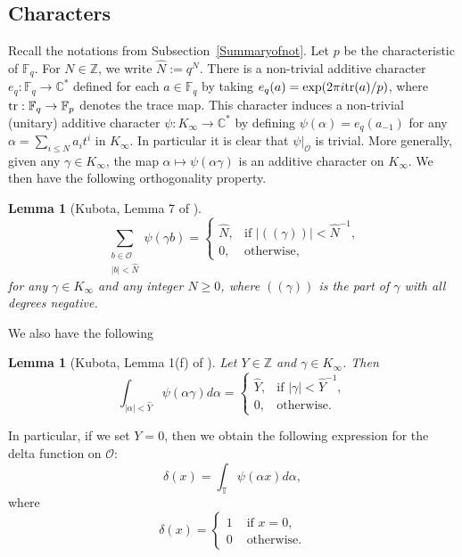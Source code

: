 \documentclass[10pt]{amsart}
\theoremstyle{plain}
\theoremstyle{plain}
\newtheorem{lemma}[theorem]{Lemma}
\theoremstyle{remark}
\theoremstyle{definition}
\newcommand{\tr}{\textup{tr}}
\renewcommand{\hat}{\widehat}
\newcommand{\Ki}{K_\infty}
\newcommand{\ki}{K_\infty}
\newcommand{\FF}{\mathbb{F}}
\newcommand{\ZZ}{\mathbb{Z}}
\newcommand{\CC}{\mathbb{C}}
\newcommand{\TT}{\mathbb{T}}
\newcommand{\cO}{\mathcal{O}}
\begin{document}
\subsection{Characters}\label{s:add-characters}
Recall the notations from Subsection~\ref{Summaryofnot}. Let $p$ be the characteristic of $\mathbb{F}_q$. For $N\in\mathbb{Z}$, we write $\hat{N}:=q^N$. There is a non-trivial additive character $e_q:\FF_q\rightarrow \CC^*$ defined
for each $a\in \FF_q$ by taking 
$e_q(a)=\exp(2\pi i \tr(a)/p)$, where $\tr: \FF_q\rightarrow \FF_p$ denotes the
trace map.
This character induces a non-trivial (unitary) additive character $\psi:
K_\infty\rightarrow \CC^*$ by defining $\psi(\alpha)=e_q(a_{-1})$ for any 
$\alpha=\sum_{i\leq N}a_i t^i$ in $\Ki$. In particular it is clear that
$\psi|_\cO$ is trivial. 
More generally, given any $\gamma \in \Ki$, the map $\alpha\mapsto \psi(\alpha\gamma)$ is an additive
character on $\Ki$. We then have the following orthogonality property.
\begin{lemma}[Kubota, Lemma 7 of
\cite{kubota}]\label{lem:orthogsum}
$$
\sum_{\substack{b\in \cO\\ |b|<\hat N}}\psi(\gamma b)=\begin{cases}
\hat N, & \mbox{if $|(\!(\gamma)\!)|<\hat N^{-1}$,}\\
0, & \mbox{otherwise},
\end{cases}
$$
for any $\gamma \in \ki$ and any integer $N\geq 0$, where $(\!(\gamma)\!)$ is the part of $\gamma$ with all degrees negative.
\end{lemma}
We also have the following
\begin{lemma}[Kubota, Lemma 1(f) of \cite{kubota}]\label{lem:orthog}
Let $Y\in \ZZ$ and $\gamma\in  \ki$. Then 
$$
\int_{|\alpha|<\hat{Y}} \psi(\alpha \gamma) d \alpha=\begin{cases}
\hat Y, &\mbox{if $|\gamma|<\hat Y^{-1}$},\\
0, &\mbox{otherwise.}
\end{cases}
$$
\end{lemma}
In particular, if we set $Y=0$, then we obtain the following expression for the delta function on $\mathcal{O}$:
\[\delta(x)=\int_{\TT}\psi(\alpha x)d\alpha,\]
where 
\[
\delta(x)=\begin{cases} 1 &\text{ if } x=0,\\ 0 &\text{ otherwise.}  \end{cases}
\]
\end{document}
